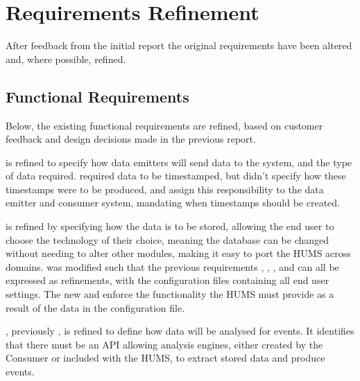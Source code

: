 \section{Requirements Refinement}
\label{sec:requirements}
After feedback from the initial report the original requirements have been 
altered and, where possible, refined.

\subsection{Functional Requirements}
\label{sec:requirements-functional}
Below, the existing functional requirements are refined, based on customer 
feedback and design decisions made in the previous report.

 is refined to specify how data emitters will send data to the system, 
and the type of data required. 
 required data to be timestamped, but didn't specify how these 
timestamps were to be produced,  and  assign this
responsibility to the data emitter and consumer system, mandating when 
timestamps should be created.

 is refined by specifying how the data is to be stored, allowing the end 
user to choose the technology of their choice, meaning the database can be 
changed without needing to alter other modules, making it easy to 
port the HUMS across domains.
 was modified such that the previous requirements , , 
, and  can all be expressed as refinements, with the 
configuration files containing all end user settings. The new  and  
enforce the  functionality the HUMS must provide as a result of the data 
in the configuration file.

, previously , is refined to define how data will be analysed for 
events. It identifies that there must be an API allowing analysis engines, 
either created by the Consumer or included with the HUMS, to extract stored 
data and produce events. 

